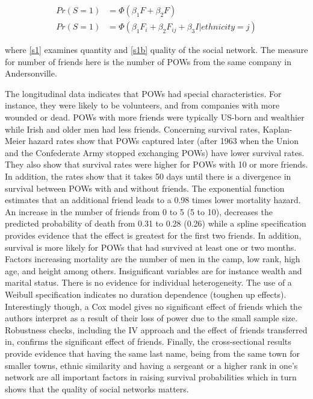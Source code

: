 \documentclass[a4paper]{report}\usepackage{graphicx, color}
\begin{document}
\begin{refsection}
\begin{align}
\label{s1} Pr(S = 1) &= \Phi (\beta_1 F + \beta_2 F)\\
\label{s1b} Pr(S = 1) &= \Phi (\beta_1 F_i + \beta_2 F_{ij} + \beta_3 I | ethnicity = j)
\end{align}

where \autoref{s1} examines quantity and \autoref{s1b} quality of the social network. The measure for number of friends here is the number of POWs from the same company in Andersonville.

The longitudinal data indicates that POWs had special characteristics. For instance, they were likely to be volunteers, and from companies with more wounded or dead. POWs with more friends were typically US-born and wealthier while Irish and older men had less friends. Concerning survival rates, Kaplan-Meier hazard rates show that POWs captured later (after 1963 when the Union and the Confederate Army stopped exchanging POWs) have lower survival rates. They also show that survival rates were higher for POWs with 10 or more friends. In addition, the rates show that it takes 50 days until there is a divergence in survival between POWs with and without friends. The exponential function estimates that an additional friend leads to a 0.98 times lower mortality hazard. An increase in the number of friends from 0 to 5 (5 to 10), decreases the predicted probability of death from 0.31 to 0.28 (0.26) while a spline specification provides evidence that the effect is greatest for the first two friends. In addition, survival is more likely for POWs that had survived at least one or two months. Factors increasing mortality are the number of men in the camp, low rank, high age, and height among others. Insignificant variables are for instance wealth and marital status. There is no evidence for individual heterogeneity. The use of a Weibull specification indicates no duration dependence (toughen up effects). Interestingly though, a Cox model gives no significant effect of friends which the authors interpret as a result of their loss of power due to the small sample size. Robustness checks, including the IV approach and the effect of friends transferred in, confirms the significant effect of friends. Finally, the cross-sectional results provide evidence that having the same last name, being from the same town for smaller towns, ethnic similarity and having a sergeant or a higher rank in one's network are all important factors in raising survival probabilities which in turn shows that the quality of social networks matters.


\end{refsection}
\end{document}
